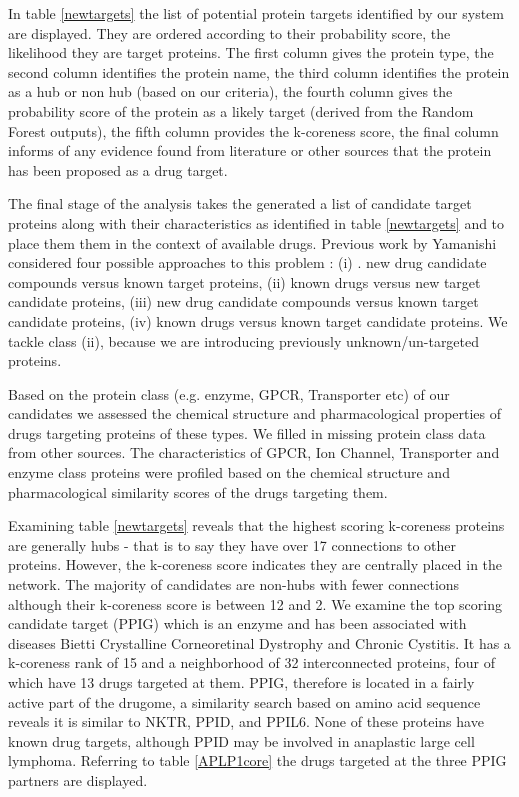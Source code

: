 \documentclass[a4paper,8pt,twocolumn,5p]{elsarticle}
\begin{document}
In table \ref{newtargets} the list of potential protein targets identified by our system are displayed. They are ordered according to their probability score,  the likelihood they are target proteins. The first column gives the protein type, the second column identifies the protein name, the third column identifies the protein as a hub or non hub (based on our criteria),  the fourth column gives the probability score of the protein as a likely target (derived from the Random Forest outputs), the fifth column provides the k-coreness score, the final column informs of any evidence found from literature or other sources that the protein has been proposed as a drug target.

The final stage of the analysis takes the generated a list of candidate target proteins along with their characteristics as identified in table \ref{newtargets} and to place them them in the context of available drugs. Previous work by Yamanishi considered four possible approaches to this problem \cite{Yamanishi2008,Yamanishi2010}: (i) . new drug candidate compounds versus known target proteins, (ii) known drugs versus new target candidate proteins, (iii) new drug candidate compounds versus known target candidate proteins, (iv) known drugs versus known target candidate proteins. We  tackle class (ii), because we are introducing previously unknown/un-targeted  proteins.

Based on the protein class (e.g. enzyme, GPCR, Transporter etc) of our candidates we assessed the chemical structure and pharmacological properties of drugs targeting proteins of these types. We filled in missing protein class data from other sources. The characteristics of GPCR, Ion Channel, Transporter and enzyme class proteins were profiled based on the chemical structure and pharmacological similarity scores of the drugs targeting them.

Examining table \ref{newtargets} reveals that the highest scoring k-coreness proteins are generally hubs - that is to say they have over 17 connections to other proteins. However, the k-coreness score indicates they are centrally placed in the network. The majority of candidates are non-hubs with fewer connections although their k-coreness score is between 12 and 2. We examine the top scoring candidate target (PPIG) which is an enzyme and has been associated with diseases Bietti Crystalline Corneoretinal Dystrophy and Chronic Cystitis. It has a k-coreness rank of  15 and a neighborhood of 32 interconnected proteins, four of which have 13 drugs targeted at them. PPIG, therefore is located in a fairly active part of the drugome, a similarity search based on amino acid sequence reveals it is similar to  NKTR, PPID, and PPIL6.  None of these proteins have known drug targets, although PPID may be involved in anaplastic large cell lymphoma. Referring to table \ref{APLP1core} the drugs targeted at the three PPIG partners  are displayed.
\end{document}
